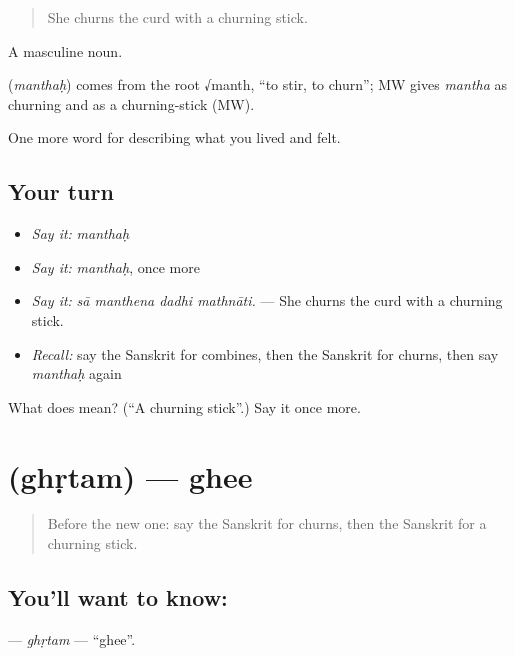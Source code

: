 \begin{quote}
She churns the curd with a churning stick.
\end{quote}

A masculine noun.

\begin{cousinweb}
\textbf{} (\emph{manthaḥ}) comes from the root √manth, \textquotedblleft{}to stir, to churn\textquotedblright{}; MW gives \emph{mantha} as churning and as a churning-stick (MW).
\end{cousinweb}

\begin{grammarlens}[title={What you've built}]
One more word for describing what you lived and felt.
\end{grammarlens}

\subsection*{Your turn}
\begin{itemize}
\raggedright
  \item \emph{Say it:} \emph{manthaḥ}
  \item \emph{Say it:} \emph{manthaḥ}, once more
  \item \emph{Say it:} \emph{sā manthena dadhi mathnāti.} — She churns the curd with a churning stick.
  \item \emph{Recall:} say the Sanskrit for combines, then the Sanskrit for churns, then say \emph{manthaḥ} again
\end{itemize}

\begin{tcolorbox}[breakable,colback=teal!4,colframe=teal!35!black,title={Before you move on}]
What does  mean? (\textquotedblleft{}A churning stick\textquotedblright{}.) Say it once more.
\end{tcolorbox}
\section[\texorpdfstring{\sk{घृतम्} (ghṛtam)}{घृतम् (ghṛtam)}]{ (ghṛtam) — ghee}

\label{lesson:SA-C513-ghrtam}



\begin{quote}
Before the new one: say the Sanskrit for churns, then the Sanskrit for a churning stick.
\end{quote}

\subsection*{You'll want to know: }
\textbf{} — \emph{ghṛtam} — \textquotedblleft{}ghee\textquotedblright{}.

